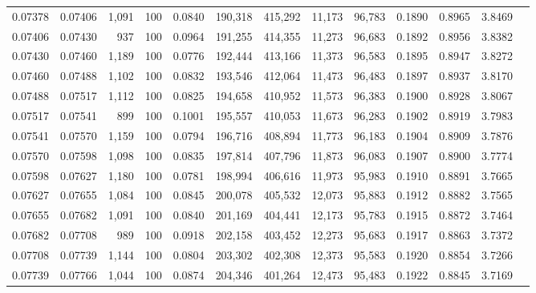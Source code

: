 \begin{tabular}{rrrrrrrrrrrrr}
0.07378 & 0.07406 & 1,091 & 100 &                                     0.0840 & 190,318 & 415,292 &  11,173 &  96,783 & 0.1890 & 0.8965 & 3.8469 \\
0.07406 & 0.07430 &   937 & 100 &                                     0.0964 & 191,255 & 414,355 &  11,273 &  96,683 & 0.1892 & 0.8956 & 3.8382 \\
0.07430 & 0.07460 & 1,189 & 100 &                                     0.0776 & 192,444 & 413,166 &  11,373 &  96,583 & 0.1895 & 0.8947 & 3.8272 \\
0.07460 & 0.07488 & 1,102 & 100 &                                     0.0832 & 193,546 & 412,064 &  11,473 &  96,483 & 0.1897 & 0.8937 & 3.8170 \\
0.07488 & 0.07517 & 1,112 & 100 &                                     0.0825 & 194,658 & 410,952 &  11,573 &  96,383 & 0.1900 & 0.8928 & 3.8067 \\
0.07517 & 0.07541 &   899 & 100 &                                     0.1001 & 195,557 & 410,053 &  11,673 &  96,283 & 0.1902 & 0.8919 & 3.7983 \\
0.07541 & 0.07570 & 1,159 & 100 &                                     0.0794 & 196,716 & 408,894 &  11,773 &  96,183 & 0.1904 & 0.8909 & 3.7876 \\
0.07570 & 0.07598 & 1,098 & 100 &                                     0.0835 & 197,814 & 407,796 &  11,873 &  96,083 & 0.1907 & 0.8900 & 3.7774 \\
0.07598 & 0.07627 & 1,180 & 100 &                                     0.0781 & 198,994 & 406,616 &  11,973 &  95,983 & 0.1910 & 0.8891 & 3.7665 \\
0.07627 & 0.07655 & 1,084 & 100 &                                     0.0845 & 200,078 & 405,532 &  12,073 &  95,883 & 0.1912 & 0.8882 & 3.7565 \\
0.07655 & 0.07682 & 1,091 & 100 &                                     0.0840 & 201,169 & 404,441 &  12,173 &  95,783 & 0.1915 & 0.8872 & 3.7464 \\
0.07682 & 0.07708 &   989 & 100 &                                     0.0918 & 202,158 & 403,452 &  12,273 &  95,683 & 0.1917 & 0.8863 & 3.7372 \\
0.07708 & 0.07739 & 1,144 & 100 &                                     0.0804 & 203,302 & 402,308 &  12,373 &  95,583 & 0.1920 & 0.8854 & 3.7266 \\
0.07739 & 0.07766 & 1,044 & 100 &                                     0.0874 & 204,346 & 401,264 &  12,473 &  95,483 & 0.1922 & 0.8845 & 3.7169 \\

\end{tabular}
